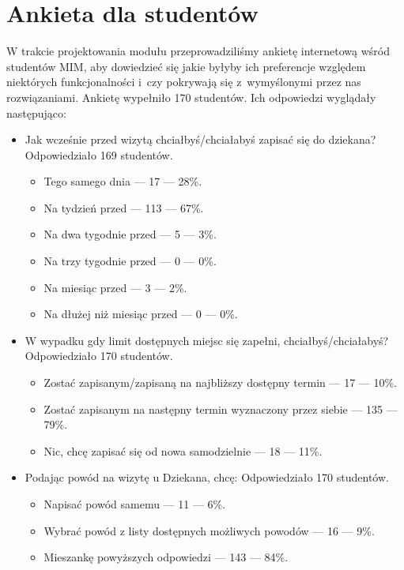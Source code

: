 \documentclass[licencjacka]{pracamgr}
\begin{document}
\section{Ankieta dla studentów}
W trakcie projektowania modułu przeprowadziliśmy ankietę internetową wśród studentów MIM, aby dowiedzieć się jakie byłyby ich preferencje względem niektórych funkcjonalności i~czy pokrywają się z~wymyślonymi przez nas rozwiązaniami. Ankietę wypełniło 170 studentów. Ich odpowiedzi wyglądały następująco:
\begin{itemize}
\setlength\itemsep{0,05em}
\item Jak wcześnie przed wizytą chciałbyś/chciałabyś zapisać się do dziekana?
Odpowiedziało 169 studentów.
\begin{itemize}
\setlength\itemsep{0,05em}
\item Tego samego dnia --- 17 --- 28\%.
\item Na tydzień przed --- 113 --- 67\%.
\item Na dwa tygodnie przed --- 5 --- 3\%.
\item Na trzy tygodnie przed --- 0 --- 0\%.
\item Na miesiąc przed --- 3 --- 2\%.
\item Na dłużej niż miesiąc przed --- 0 --- 0\%.
\end{itemize}

\item W wypadku gdy limit dostępnych miejsc się zapełni, chciałbyś/chciałabyś?
Odpowiedziało 170 studentów.
\begin{itemize}
\setlength\itemsep{0,05em}
\item Zostać zapisanym/zapisaną na najbliższy dostępny termin --- 17 --- 10\%.
\item Zostać zapisanym na następny termin wyznaczony przez siebie --- 135 --- 79\%.
\item Nic, chcę zapisać się od nowa samodzielnie --- 18 --- 11\%.
\end{itemize}

\item Podając powód na wizytę u Dziekana, chcę:
Odpowiedziało 170 studentów.
\begin{itemize}
\setlength\itemsep{0,05em}

\item Napisać powód samemu --- 11 --- 6\%.
\item Wybrać powód z listy dostępnych możliwych powodów --- 16 --- 9\%.
\item Mieszankę powyższych odpowiedzi --- 143 --- 84\%.
\end{itemize}


\end{itemize}
\end{document}
